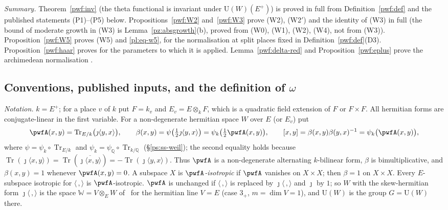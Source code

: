 \documentclass[10pt]{amsart}
\theoremstyle{definition}
\theoremstyle{remark}
\newcommand{\Q}{\mathbb Q}
\providecommand{\auU}{\mathrm U}
\providecommand{\aubar}[1]{\overline{#1}}
\begin{document}
\emph{Summary.} Theorem~\ref{pwf:inv} (the theta functional is invariant under $\auU(W)(E^+)$) is
proved in full from Definition~\ref{pwf:def} and the published statements (P1)--(P5) below.
Propositions~\ref{pwf:W2} and~\ref{pwf:W3} prove (W2), (W2$'$) and the identity of (W3) in full
(the bound of moderate growth in (W3) is Lemma~\ref{pz:absgrowth}(b), proved from (W0), (W1), (W2),
(W4), not from (W3)). Proposition~\ref{pwf:W5} proves (W5) and
\eqref{pl:eq-w5}, for the normalisation at split places fixed in Definition~\ref{pwf:def}(D3).
Proposition~\ref{pwf:haar} proves {\cite[Proposition~5.2]{P51}} for the parameters to which it is
applied. Lemma~\ref{pwf:delta-red} and Proposition~\ref{pwf:eplus} prove the archimedean
normalisation {\cite[(30)]{P54}}.

\subsection{Conventions, published inputs, and the definition of $\omega$}\label{pwf:ss-def}

\emph{Notation.} $k=E^+$; for a place $v$ of $k$ put $F=k_v$ and $E_v=E\otimes_kF$, which is a
quadratic field extension of $F$ or $F\times F$. All hermitian forms are conjugate-linear in the
first variable. For a non-degenerate hermitian space $W$ over $E$ (or $E_v$) put
\[
\pwfA(x,y)=\operatorname{Tr}_{E/k}\bigl(\jmath\langle y,x\rangle\bigr),\qquad
\beta(x,y)=\psi\bigl(\tfrac12\jmath\langle y,x\rangle\bigr)=\psi_k\bigl(\tfrac12\pwfA(x,y)\bigr),\qquad
[x,y]=\beta(x,y)\beta(y,x)^{-1}=\psi_k\bigl(\pwfA(x,y)\bigr),
\]
where $\psi=\psi_k\circ\operatorname{Tr}_{E/k}$ and $\psi_k=\psi_\Q\circ\operatorname{Tr}_{k/\Q}$
(\S\ref{ps:ss-weil}); the second equality holds because $\operatorname{Tr}(\jmath\langle x,y\rangle)
=\operatorname{Tr}(\aubar{\jmath\langle x,y\rangle})=-\operatorname{Tr}(\jmath\langle y,x\rangle)$.
Thus $\pwfA$ is a non-degenerate alternating $k$-bilinear form, $\beta$ is bimultiplicative, and
$\beta(x,y)=1$ whenever $\pwfA(x,y)=0$. A subspace $X$ is \emph{$\pwfA$-isotropic} if $\pwfA$
vanishes on $X\times X$; then $\beta=1$ on $X\times X$. Every $E$-subspace isotropic for
$\langle\,,\rangle$ is $\pwfA$-isotropic. $\pwfA$ is unchanged if $\langle\,,\rangle$ is replaced by
$\jmath\langle\,,\rangle$ and $\jmath$ by $1$; so $W$ with the skew-hermitian form
$\jmath\langle\,,\rangle$ is the space $\mathbb W=V\otimes_EW$ of~\cite{KudlaSplitting} for the
hermitian line $V=E$ (case $3_+$, $m=\dim V=1$), and $\auU(W)$ is the group $G=\auU(W)$ there.
\end{document}
